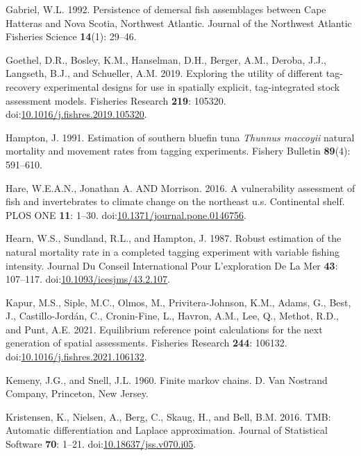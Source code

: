 \documentclass[
]{article}
\newlength{\cslhangindent}
\newlength{\cslentryspacingunit} %
\newenvironment{CSLReferences}[2] %
 {%
  \setlength{\parindent}{0pt}
  \ifodd #1
  \let\oldpar\par
  \def\par{\hangindent=\cslhangindent\oldpar}
  \fi
  \setlength{\parskip}{#2\cslentryspacingunit}
 }%
 {}
\begin{document}
\begin{CSLReferences}{1}{0}
\leavevmode{}%
Gabriel, W.L. 1992. Persistence of demersal fish assemblages between
{C}ape {H}atteras and {N}ova {S}cotia, {N}orthwest {A}tlantic. Journal
of the Northwest Atlantic Fisheries Science \textbf{14}(1): 29--46.

\leavevmode{}%
Goethel, D.R., Bosley, K.M., Hanselman, D.H., Berger, A.M., Deroba,
J.J., Langseth, B.J., and Schueller, A.M. 2019. Exploring the utility of
different tag-recovery experimental designs for use in spatially
explicit, tag-integrated stock assessment models. Fisheries Research
\textbf{219}: 105320.
doi:\href{https://doi.org/10.1016/j.fishres.2019.105320}{10.1016/j.fishres.2019.105320}.

\leavevmode{}%
Hampton, J. 1991. Estimation of southern bluefin tuna \emph{{T}hunnus
maccoyii} natural mortality and movement rates from tagging experiments.
Fishery Bulletin \textbf{89}(4): 591--610.

\leavevmode{}%
Hare, W.E.A.N., Jonathan A. AND Morrison. 2016. A vulnerability
assessment of fish and invertebrates to climate change on the northeast
u.s. Continental shelf. PLOS ONE \textbf{11}: 1--30.
doi:\href{https://doi.org/10.1371/journal.pone.0146756}{10.1371/journal.pone.0146756}.

\leavevmode{}%
Hearn, W.S., Sundland, R.L., and Hampton, J. 1987. Robust estimation of
the natural mortality rate in a completed tagging experiment with
variable fishing intensity. Journal Du Conseil International Pour
L'exploration De La Mer \textbf{43}: 107--117.
doi:\href{https://doi.org/10.1093/icesjms/43.2.107}{10.1093/icesjms/43.2.107}.

\leavevmode{}%
Kapur, M.S., Siple, M.C., Olmos, M., Privitera-Johnson, K.M., Adams, G.,
Best, J., Castillo-Jordán, C., Cronin-Fine, L., Havron, A.M., Lee, Q.,
Methot, R.D., and Punt, A.E. 2021. Equilibrium reference point
calculations for the next generation of spatial assessments. Fisheries
Research \textbf{244}: 106132.
doi:\href{https://doi.org/10.1016/j.fishres.2021.106132}{10.1016/j.fishres.2021.106132}.

\leavevmode{}%
Kemeny, J.G., and Snell, J.L. 1960. Finite markov chains. D. Van
Nostrand Company, Princeton, New Jersey.

\leavevmode{}%
Kristensen, K., Nielsen, A., Berg, C., Skaug, H., and Bell, B.M. 2016.
{TMB}: Automatic differentiation and {Laplace} approximation. Journal of
Statistical Software \textbf{70}: 1--21.
doi:\href{https://doi.org/10.18637/jss.v070.i05}{10.18637/jss.v070.i05}.


\end{CSLReferences}
\end{document}

